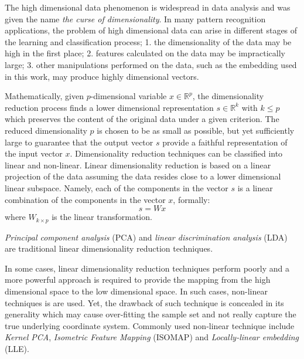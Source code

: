 \iftoggle{edit-mode}{\hspace{0pt}\marginpar{The curse of dimensionality}}{}
The high dimensional data phenomenon is widespread in data analysis and was given the name \emph{the curse of dimensionality}. 
In many pattern recognition applications, the problem of high dimensional data can arise in different stages of the learning and classification process; 1. the dimensionality of the data may be high in the first place; 2. features calculated on the data may be impractically large; 3. other manipulations performed on the data, such as the embedding used in this work, may produce highly dimensional vectors.

\iftoggle{edit-mode}{\hspace{0pt}\marginpar{Mathematical Definition}}{}
Mathematically, given $p$-dimensional variable $x \in \mathbb{R}^p$, the dimensionality reduction process finds a lower dimensional representation $s \in \mathbb{R}^k$ with $k \leq p$ which preserves the content of the original data under a given criterion. 
The reduced dimensionality $p$ is chosen to be as small as possible, but yet sufficiently large to guarantee that the output vector $s$ provide a faithful representation of the input vector $x$. 
Dimensionality reduction techniques can be classified into linear and non-linear. Linear dimensionality reduction is based on a linear projection of the data assuming the data resides close to a lower dimensional linear subspace. 
Namely, each of the components in the vector $s$ is a linear combination of the components in the vector $x$, formally:
\begin{equation}
s=Wx
\end{equation}
where $W_{k \times p}$ is the linear transformation.

\iftoggle{edit-mode}{\hspace{0pt}\marginpar{Linear DR}}{}
\emph{Principal component analysis} (PCA) and \emph{linear discrimination analysis} (LDA) are traditional linear dimensionality reduction techniques.

\iftoggle{edit-mode}{\hspace{0pt}\marginpar{Non-Linear DR}}{}
In some cases, linear dimensionality reduction techniques perform poorly and a more powerful approach is required to provide the mapping from the high dimensional space to the low dimensional space. In such cases, non-linear techniques is are used. Yet, the drawback of such technique is concealed in its generality which may cause over-fitting the sample set and not really capture the true underlying coordinate system. Commonly used non-linear technique include \emph{Kernel PCA}, \emph{Isometric Feature Mapping} (ISOMAP) and \emph{Locally-linear embedding} (LLE).

